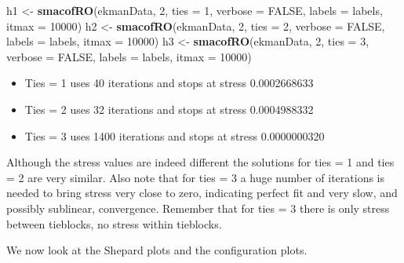 \documentclass[
  12pt,
]{article}
\newenvironment{Shaded}{\begin{snugshade}}{\end{snugshade}}
\newcommand{\AttributeTok}[1]{\textcolor[rgb]{0.13,0.29,0.53}{#1}}
\newcommand{\ConstantTok}[1]{\textcolor[rgb]{0.56,0.35,0.01}{#1}}
\newcommand{\DecValTok}[1]{\textcolor[rgb]{0.00,0.00,0.81}{#1}}
\newcommand{\FunctionTok}[1]{\textcolor[rgb]{0.13,0.29,0.53}{\textbf{#1}}}
\newcommand{\NormalTok}[1]{#1}
\newcommand{\OtherTok}[1]{\textcolor[rgb]{0.56,0.35,0.01}{#1}}
\providecommand{\tightlist}{%
  \setlength{\itemsep}{0pt}\setlength{\parskip}{0pt}}
\begin{document}
\begin{Shaded}
\begin{Highlighting}[]
\NormalTok{h1 }\OtherTok{\textless{}{-}} \FunctionTok{smacofRO}\NormalTok{(ekmanData, }\DecValTok{2}\NormalTok{, }\AttributeTok{ties =} \DecValTok{1}\NormalTok{, }\AttributeTok{verbose =} \ConstantTok{FALSE}\NormalTok{, }\AttributeTok{labels =}\NormalTok{ labels, }\AttributeTok{itmax =} \DecValTok{10000}\NormalTok{)}
\NormalTok{h2 }\OtherTok{\textless{}{-}} \FunctionTok{smacofRO}\NormalTok{(ekmanData, }\DecValTok{2}\NormalTok{, }\AttributeTok{ties =} \DecValTok{2}\NormalTok{, }\AttributeTok{verbose =} \ConstantTok{FALSE}\NormalTok{, }\AttributeTok{labels =}\NormalTok{ labels, }\AttributeTok{itmax =} \DecValTok{10000}\NormalTok{)}
\NormalTok{h3 }\OtherTok{\textless{}{-}} \FunctionTok{smacofRO}\NormalTok{(ekmanData, }\DecValTok{2}\NormalTok{, }\AttributeTok{ties =} \DecValTok{3}\NormalTok{, }\AttributeTok{verbose =} \ConstantTok{FALSE}\NormalTok{, }\AttributeTok{labels =}\NormalTok{ labels, }\AttributeTok{itmax =} \DecValTok{10000}\NormalTok{)}
\end{Highlighting}
\end{Shaded}

\begin{itemize}
\tightlist
\item
  Ties = 1 uses 40 iterations and stops at stress 0.0002668633
\item
  Ties = 2 uses 32 iterations and stops at stress 0.0004988332
\item
  Ties = 3 uses 1400 iterations and stops at stress 0.0000000320
\end{itemize}

Although the stress values are indeed different the solutions for ties = 1 and ties = 2 are very similar.
Also note that for ties = 3 a huge number of iterations is needed to
bring stress very close to zero, indicating perfect fit and very slow, and possibly sublinear, convergence.
Remember that for ties = 3 there is only stress between tieblocks, no stress within tieblocks.

We now look at the Shepard plots and the configuration plots.
\end{document}
